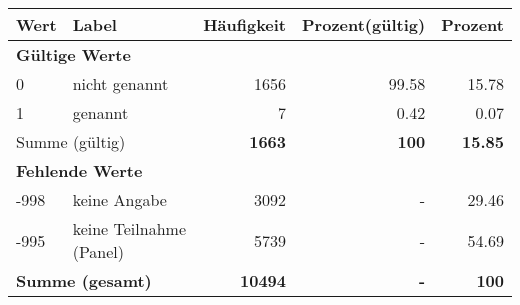      \begin{longtable}{lXrrr}
     \toprule
     \textbf{Wert} & \textbf{Label} & \textbf{Häufigkeit} & \textbf{Prozent(gültig)} & \textbf{Prozent} \\
     \endhead
     \midrule
     \multicolumn{5}{l}{\textbf{Gültige Werte}}\\

     0 &
     \multicolumn{1}{X}{ nicht genannt   } &


       \num{1656} &
       \num[round-mode=places,round-precision=2]{99,58} &
         \num[round-mode=places,round-precision=2]{15,78} \\

     1 &
     \multicolumn{1}{X}{ genannt   } &


       \num{7} &
       \num[round-mode=places,round-precision=2]{0,42} &
         \num[round-mode=places,round-precision=2]{0,07} \\
     \midrule
     \multicolumn{2}{l}{Summe (gültig)} &
       \textbf{\num{1663}} &
     \textbf{100} &
       \textbf{\num[round-mode=places,round-precision=2]{15,85}} \\
     \multicolumn{5}{l}{\textbf{Fehlende Werte}}\\
       -998 &
       keine Angabe &
         \num{3092} &
        - &
         \num[round-mode=places,round-precision=2]{29,46} \\
       -995 &
       keine Teilnahme (Panel) &
         \num{5739} &
        - &
         \num[round-mode=places,round-precision=2]{54,69} \\
     \midrule
     \multicolumn{2}{l}{\textbf{Summe (gesamt)}} &
          \textbf{\num{10494}} &
        \textbf{-} &
        \textbf{100} \\
     \bottomrule
     \end{longtable}
     
